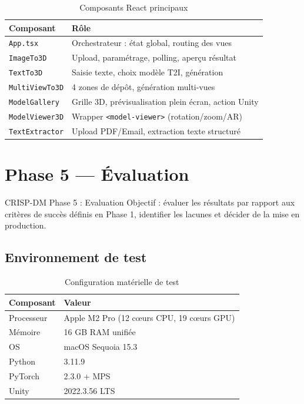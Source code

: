 \documentclass[12pt,a4paper,oneside]{report}
\begin{document}
\begin{table}[H]
\centering
\caption{Composants React principaux}
\label{tab:components}
\begin{tabularx}{\linewidth}{@{}lX@{}}
\toprule
\textbf{Composant} & \textbf{Rôle} \\\midrule
\texttt{App.tsx}        & Orchestrateur : état global, routing des vues \\
\texttt{ImageTo3D}      & Upload, paramétrage, polling, aperçu résultat \\
\texttt{TextTo3D}       & Saisie texte, choix modèle T2I, génération \\
\texttt{MultiViewTo3D}  & 4 zones de dépôt, génération multi-vues \\
\texttt{ModelGallery}   & Grille 3D, prévisualisation plein écran, action Unity \\
\texttt{ModelViewer3D}  & Wrapper \texttt{<model-viewer>} (rotation/zoom/AR) \\
\texttt{TextExtractor}  & Upload PDF/Email, extraction texte structuré \\
\bottomrule
\end{tabularx}
\end{table}

\chapter{Phase 5 — Évaluation}

\begin{crispbox}{CRISP-DM Phase 5 : Evaluation}
Objectif : évaluer les résultats par rapport aux critères de succès définis
en Phase 1, identifier les lacunes et décider de la mise en production.
\end{crispbox}

\section{Environnement de test}

\begin{table}[H]
\centering
\caption{Configuration matérielle de test}
\label{tab:env}
\begin{tabular}{@{}ll@{}}
\toprule
\textbf{Composant} & \textbf{Valeur} \\\midrule
Processeur & Apple M2 Pro (12 cœurs CPU, 19 cœurs GPU) \\
Mémoire    & 16 GB RAM unifiée \\
OS         & macOS Sequoia 15.3 \\
Python     & 3.11.9 \\
PyTorch    & 2.3.0 + MPS \\
Unity      & 2022.3.56 LTS \\
\bottomrule
\end{tabular}
\end{table}
\end{document}
